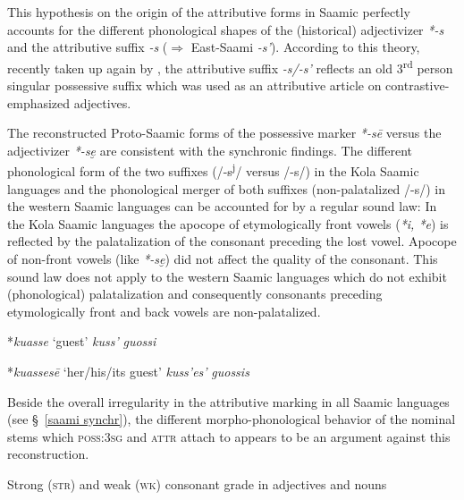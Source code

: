 {This hypothesis on the origin of the attributive forms in Saamic perfectly accounts for the different phonological shapes of the (historical) adjectivizer \mbox{\textit{*-s}} and the attributive suffix \textit{-s} ($\Rightarrow$ East-Saami \textit{-s'}). According to this theory, recently taken up again by \cite{riesler2006b}, the attributive suffix \textit{-s/-s'} reflects an old 3\textsuperscript{rd} person singular possessive suffix which was used as an attributive article on contrastive-emphasized adjectives.

The reconstructed Proto-Saamic forms of the possessive marker \textit{*-sē} \cite[73]{sammallahti1998b} versus the adjectivizer \textit{*-se̮} are consistent with the synchronic findings. The different phonological form of the two suffixes (/-s\textsuperscript{j}/ versus /-s/) in the Kola Saamic languages and the phonological merger of both suffixes (non-palatalized /-s/) in the western Saamic languages can be accounted for by a regular sound law: In the Kola Saamic languages the apocope of etymologically front vowels (\textit{*i, *e}) is reflected by the palatalization of the consonant preceding the lost vowel. Apocope of non-front vowels (like \textit{*-se̮}) did not affect the quality of the consonant. This sound law does not apply to the western Saamic languages which do not exhibit (phonological) palatalization and consequently consonants preceding etymologically front and back vowels are non-palatalized.
\begin{exe}
\ex
\begin{xlist}
\ex
\begin{xlist}
	*\textit{kuasse} ‘guest’
	\textit{kuss'}
 \textit{guossi}
\end{xlist}
\ex
\begin{xlist}
	*\textit{kuassesē} ‘her/his/its guest’
	\textit{kuss'es'}
 \textit{guossis}
\end{xlist}
\end{xlist}
\end{exe}
Beside the overall irregularity in the attributive marking in all Saamic languages (see \S~\ref{saami synchr}), the different morpho-phonological behavior of the nominal stems which \textsc{poss:3sg} and \textsc{attr} attach to appears to be an argument against this reconstruction. 
\begin{exe}
\ex Strong (\textsc{str}) and weak (\textsc{wk}) consonant grade in adjectives and nouns

\end{exe}}

